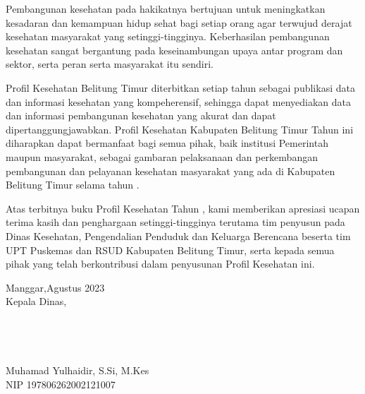 Pembangunan kesehatan pada hakikatnya bertujuan untuk meningkatkan kesadaran dan kemampuan hidup sehat bagi setiap orang agar terwujud derajat kesehatan masyarakat yang setinggi-tingginya. Keberhasilan pembangunan kesehatan sangat bergantung pada keseinambungan upaya antar program dan sektor, serta peran serta masyarakat itu sendiri.

Profil Kesehatan Belitung Timur diterbitkan setiap tahun sebagai publikasi data dan informasi kesehatan yang kompeherensif, sehingga dapat menyediakan data dan informasi pembangunan kesehatan yang akurat dan dapat dipertanggungjawabkan. Profil Kesehatan Kabupaten Belitung Timur Tahun \tPnos{} ini diharapkan dapat bermanfaat bagi semua pihak, baik institusi Pemerintah maupun masyarakat, sebagai gambaran pelaksanaan dan perkembangan pembangunan dan pelayanan kesehatan masyarakat yang ada di Kabupaten Belitung Timur selama tahun \tPnos{}. 

\endgroup

Atas terbitnya buku Profil Kesehatan Tahun \tPnos{}, kami memberikan apresiasi ucapan terima kasih dan penghargaan setinggi-tingginya terutama tim penyusun pada Dinas Kesehatan, Pengendalian Penduduk dan Keluarga Berencana beserta tim UPT Puskemas dan RSUD Kabupaten Belitung Timur, serta kepada semua pihak yang telah berkontribusi dalam penyusunan Profil Kesehatan \tPnos{} ini.


\vspace*{4ex}
\noindent Manggar,\hspace{3em}Agustus 2023\\
Kepala Dinas,\\
\\
\\
\\
\\
Muhamad Yulhaidir, S.Si, M.Kes\\
NIP 197806262002121007 


\leftskip 0pt
